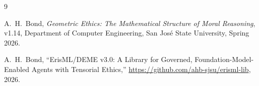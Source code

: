 \documentclass[12pt]{article}
\begin{document}
\begin{thebibliography}{9}

A.~H.~Bond, \emph{Geometric Ethics: The Mathematical Structure of Moral Reasoning}, v1.14, Department of Computer Engineering, San Jos\'e State University, Spring 2026.

A.~H.~Bond, ``ErisML/DEME v3.0: A Library for Governed, Foundation-Model-Enabled Agents with Tensorial Ethics,'' \url{https://github.com/ahb-sjsu/erisml-lib}, 2026.

\end{thebibliography}
\end{document}
